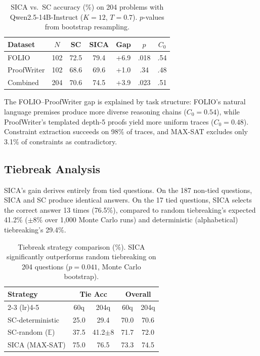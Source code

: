 \documentclass[11pt,a4paper]{article}
\begin{document}
\begin{table}[t]
\centering
\small
\begin{tabular}{lcccccc}
\toprule
\textbf{Dataset} & $N$ & \textbf{SC} & \textbf{SICA} & \textbf{Gap} & $p$ & $C_0$ \\
\midrule
FOLIO & 102 & 72.5 & 79.4 & +6.9 & .018 & .54 \\
ProofWriter & 102 & 68.6 & 69.6 & +1.0 & .34 & .48 \\
\midrule
Combined & 204 & 70.6 & 74.5 & +3.9 & .023 & .51 \\
\bottomrule
\end{tabular}
\caption{SICA vs.\ SC accuracy (\%) on 204 problems with Qwen2.5-14B-Instruct ($K\!=\!12$, $T\!=\!0.7$). $p$-values from bootstrap resampling.}
\label{tab:main}
\end{table}

The FOLIO--ProofWriter gap is explained by task structure: FOLIO's natural language premises produce more diverse reasoning chains ($C_0 = 0.54$), while ProofWriter's templated depth-5 proofs yield more uniform traces ($C_0 = 0.48$). Constraint extraction succeeds on 98\% of traces, and MAX-SAT excludes only 3.1\% of constraints as contradictory.

\subsection{Tiebreak Analysis}
\label{sec:tiebreak}

SICA's gain derives entirely from tied questions. On the 187 non-tied questions, SICA and SC produce identical answers. On the 17 tied questions, SICA selects the correct answer 13 times (76.5\%), compared to random tiebreaking's expected 41.2\% ($\pm 8\%$ over 1,000 Monte Carlo runs) and deterministic (alphabetical) tiebreaking's 29.4\%.

\begin{table}[t]
\centering
\small
\begin{tabular}{lcccc}
\toprule
\textbf{Strategy} & \multicolumn{2}{c}{\textbf{Tie Acc}} & \multicolumn{2}{c}{\textbf{Overall}} \\
\cmidrule(lr){2-3} \cmidrule(lr){4-5}
 & 60q & 204q & 60q & 204q \\
\midrule
SC-deterministic & 25.0 & 29.4 & 70.0 & 70.6 \\
SC-random ($\mathbb{E}$) & 37.5 & 41.2\tiny{$\pm$8} & 71.7 & 72.0 \\
SICA (MAX-SAT) & 75.0 & 76.5 & 73.3 & 74.5 \\
\bottomrule
\end{tabular}
\caption{Tiebreak strategy comparison (\%). SICA significantly outperforms random tiebreaking on 204 questions ($p=0.041$, Monte Carlo bootstrap).}
\label{tab:tiebreak}
\end{table}
\end{document}
